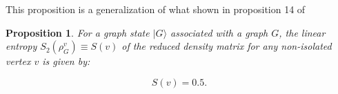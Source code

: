 \documentclass{article}
\newtheorem{prop}{Proposition}
\DeclareMathOperator{\Tr}{Tr}
\newcommand{\ket}[1]{|#1\rangle}
\newcommand{\bra}[1]{\langle #1|}
\begin{document}
This proposition is a generalization of what shown in proposition 14 of \cite{hein2006entanglement}


\begin{prop}
\label{prop:entropy_of_single_qubit_in_graph_state}
For a graph state \(\ket{G}\) associated with a graph \(G\), the linear entropy \(S_2(\rho^v_G) \equiv S(v)\) of the reduced density matrix for any non-isolated vertex \(v\) is given by:  

\begin{equation}
\label{eq:entropy_of_single_qubit_in_graph_state}
 S(v) = 0.5.
\end{equation}
\end{prop}
\end{document}
